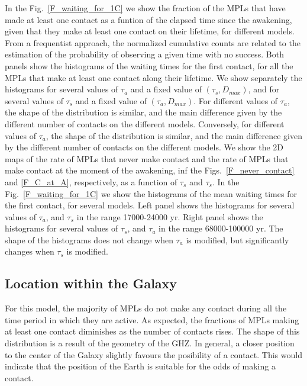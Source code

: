 In the Fig.~\ref{F_waiting_for_1C} we show the fraction of the MPLs
that have made at least one contact as a funtion of the elapsed time
since the awakening, given that they make at least one contact on
their lifetime, for different models.
%
From a frequentist approach, the normalized cumulative counts are
related to the estimation of the probability of observing a given time
with no success.
%             
Both panels show the histograms of the waiting times for the first
contact, for all the MPLs that make at least one contact along their
lifetime.
%
We show separately the histograms for several values of $\tau_a$ and a
fixed value of $(\tau_s, D_{max})$, and for several values of $\tau_s$
and a fixed value of $(\tau_a, D_{max})$.
%
For different values of $\tau_a$, the shape of the distribution is
similar, and the main difference given by the different number of
contacts on the different models.
%
Conversely, for different values of $\tau_a$, the shape of the
distribution is similar, and the main difference given by the
different number of contacts on the different models. 
%
We show the 2D maps of the rate of MPLs that never make contact and
the rate of MPLs that make contact at the moment of the awakening,
inf the Figs.~\ref{F_never_contact} and \ref{F_C_at_A}, respectively,
as a function of $\tau_s$ and $\tau_s$.
%
In the Fig.~\ref{F_waiting_for_1C} we show the histograms of the mean
waiting times for the first contact, for several models.
%
Left panel shows the histograms for several values of $\tau_a$, and
$\tau_s$ in the range 17000-24000 yr.
%
Right panel shows the histograms for several values of $\tau_s$, and
$\tau_a$ in the range 68000-100000 yr.
%
The shape of the histograms does not change when $\tau_a$ is modified,
but significantly changes when $\tau_s$ is modified.



\subsection{Location within the Galaxy}\label{SS_location}
    
%
For this model, the majority of MPLs do not make any contact during
all the time period in which they are active.
%
As expected, the fractions of MPLs making at least one contact
diminishes as the number of contacts rises.
%
The shape of this distribution is a result of the geometry of the GHZ.
%
In general, a closer position to the center of the Galaxy slightly
favours the posibility of a contact.
%
This would indicate that the position of the Earth is suitable for the
odds of making a contact.

